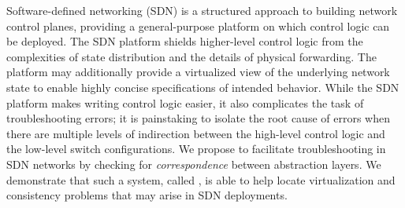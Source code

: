 Software-defined networking (SDN) is a structured approach to
building network control planes, providing a general-purpose
platform on which control logic can be deployed. The SDN
platform shields higher-level control logic from the
complexities of state distribution and the details of
physical forwarding. The platform may additionally provide a
virtualized view of the underlying network state to enable
highly concise specifications of intended behavior. While the SDN platform
makes writing control logic easier, it also 
complicates the task of troubleshooting errors;
it is painstaking to isolate the root cause of errors when there are multiple
levels of indirection between the high-level control logic and the low-level
switch configurations. We propose to facilitate troubleshooting in SDN networks by
checking for {\em correspondence} between abstraction
layers. We demonstrate that such a system, called \projectname{}, is able to help locate
virtualization and consistency problems that may arise in SDN deployments.
